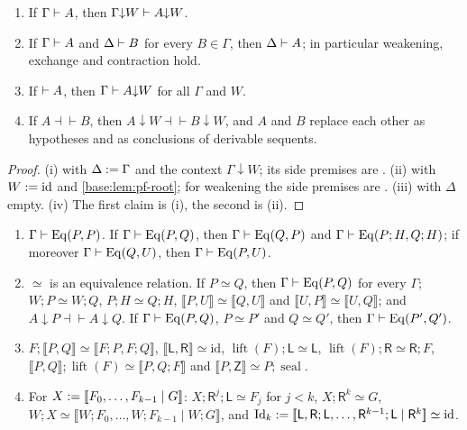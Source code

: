 \begin{lemma}
\label{base:lem:pf-struct}
\begin{enumerate}[label=\textup{(\roman*)}]
\item If $\Gamma\vdash A$, then $\Gamma{\downarrow}W\vdash A{\downarrow}W$.
\item If $\Gamma\vdash A$ and $\Delta\vdash B$ for every $B\in\Gamma$,
 then $\Delta\vdash A$; in particular weakening, exchange and contraction
 hold.
\item If $\vdash A$, then $\Gamma\vdash A{\downarrow}W$ for all $\Gamma$
 and $W$.
\item If $A\dashv\vdash B$, then $A{\downarrow}W\dashv\vdash B{\downarrow}W$,
 and $A$ and $B$ replace each other as hypotheses and as conclusions of
 derivable sequents.
\end{enumerate}
\end{lemma}

\begin{proof}
(i)  with $\Delta\mathrel{:=}\Gamma$ and the context
$\Gamma{\downarrow}W$; its side premises are .  (ii)
 with $W\mathrel{:=}\mathrm{id}$ and \cref{base:lem:pf-root}; for
weakening the side premises are .  (iii)  with
$\Delta$ empty.  (iv) The first claim is (i), the second is (ii).
\end{proof}

\begin{lemma}[Equality]
\label{base:lem:pf-eq}
\begin{enumerate}[label=\textup{(\roman*)}]
\item $\Gamma\vdash\mathrm{Eq}(P,P)$.  If $\Gamma\vdash\mathrm{Eq}(P,Q)$,
 then $\Gamma\vdash\mathrm{Eq}(Q,P)$ and
 $\Gamma\vdash\mathrm{Eq}(P;H,Q;H)$; if moreover
 $\Gamma\vdash\mathrm{Eq}(Q,U)$, then $\Gamma\vdash\mathrm{Eq}(P,U)$.
\item $\simeq$ is an equivalence relation.  If $P\simeq Q$, then
 $\Gamma\vdash\mathrm{Eq}(P,Q)$ for every $\Gamma$; $W;P\simeq W;Q$,
 $P;H\simeq Q;H$, $\llbracket P,U\rrbracket\simeq\llbracket Q,U\rrbracket$
 and $\llbracket U,P\rrbracket\simeq\llbracket U,Q\rrbracket$; and
 $A{\downarrow}P\dashv\vdash A{\downarrow}Q$.  If
 $\Gamma\vdash\mathrm{Eq}(P,Q)$, $P\simeq P'$ and $Q\simeq Q'$, then
 $\Gamma\vdash\mathrm{Eq}(P',Q')$.
\item $F;\llbracket P,Q\rrbracket\simeq\llbracket F;P,F;Q\rrbracket$,
 $\llbracket\mathsf L,\mathsf R\rrbracket\simeq\mathrm{id}$,
 $\operatorname{lift}(F);\mathsf L\simeq\mathsf L$,
 $\operatorname{lift}(F);\mathsf R\simeq\mathsf R;F$,
 $\llbracket P,Q\rrbracket;\operatorname{lift}(F)\simeq\llbracket P,Q;F\rrbracket$
 and $\llbracket P,\mathsf Z\rrbracket\simeq P;\operatorname{seal}$.
\item For $X\mathrel{:=}[\![ F_0,\dots,F_{k-1}\mid G]\!]$:
 $X;\mathsf R^{j};\mathsf L\simeq F_j$ for $j<k$, $X;\mathsf R^{k}\simeq G$,
 $W;X\simeq\llbracket W;F_0,\dots,W;F_{k-1}\mid W;G\rrbracket$, and
 $\mathrm{Id}_k\mathrel{:=}[\![\mathsf L,\mathsf R;\mathsf L,\dots,
 \mathsf R^{k-1};\mathsf L\mid\mathsf R^{k}]\!]\simeq\mathrm{id}$.
\end{enumerate}
\end{lemma}

